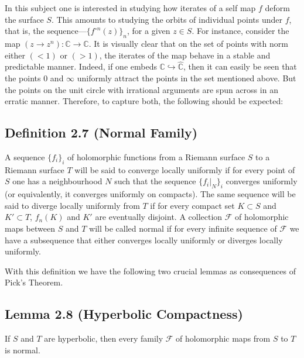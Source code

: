 \documentclass[11pt,a4paper]{article}
\begin{document}
        In this subject one is interested in studying how iterates of a self map $f$ deform the surface $S$. This amounts to studying the orbits of individual points under $f$, that is, the sequence---$\{f^{\circ n}(z)\}_n$, for a given $z \in S$. For instance, consider the map $(z \rightarrow z^n): \mathbb{C} \rightarrow \mathbb{C}$. It is visually clear that on the set of points with norm either $(< 1)$ or $(> 1)$, the iterates of the map behave in a stable and predictable manner. Indeed, if one embeds $\mathbb{C} \hookrightarrow \hat{\mathbb{C}}$, then it can easily be seen that the points $0$ and $\infty$ uniformly attract the points in the set mentioned above. But the points on the unit circle with irrational arguments are spun across in an erratic manner. Therefore, to capture both, the following should be expected:

        \subsection*{Definition 2.7 (Normal Family)} A sequence $\{f_i\}_i$ of holomorphic functions from a Riemann surface $S$ to a Riemann surface $T$ will be said to converge locally uniformly if for every point of $S$ one has a neighbourhood $N$ such that the sequence $\{f_i\big|_N\}_i$ converges uniformly (or equivalently, it converges uniformly on compacts). The same sequence will be said to diverge locally uniformly from $T$ if for every compact set $K \subset S$ and $K' \subset T$, $f_n(K)$ and $K'$ are eventually disjoint.
        A collection $\mathcal{F}$ of holomorphic maps between $S$ and $T$ will be called normal if for every infinite sequence of $\mathcal{F}$ we have a subsequence that either converges locally uniformly or diverges locally uniformly.



        With this definition we have the following two crucial lemmas as consequences of Pick's Theorem.

        \subsection*{Lemma 2.8 (Hyperbolic Compactness)} If $S$ and $T$ are hyperbolic, then every family $\mathcal{F}$ of holomorphic maps from $S$ to $T$ is normal.
\end{document}

